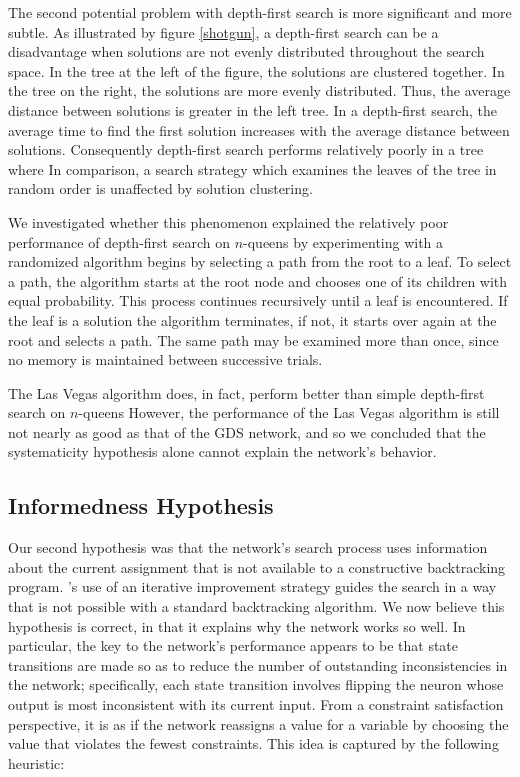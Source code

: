 \documentclass[twoside,12pt,titlepage,a4paper]{article}
\begin{document}
The second potential problem with depth-first search is more significant
and more subtle. As illustrated by figure \ref{shotgun}, a depth-first
search can be a
disadvantage when solutions are not evenly distributed throughout the
search space.  In the tree at the left of the figure, the solutions 
are clustered together. In the tree on the right,
the solutions are more evenly distributed. Thus, the average distance
between solutions is greater in the left tree.  In a depth-first
search, the average time to find the first solution 
increases with the average distance between solutions. Consequently
depth-first search performs relatively poorly in a tree where
In comparison,
a search strategy which examines the leaves of the tree in random
order is unaffected by solution clustering.

We investigated whether this phenomenon explained the relatively poor
performance 
of depth-first search on $n$-queens by experimenting with a randomized
algorithm begins by selecting a path from the root to a leaf. To
select a path, the algorithm starts at the root node and chooses one
of its children with equal probability. This process continues
recursively until a leaf is encountered.  If the leaf is a solution
the algorithm terminates, if not, it starts over again at the root and
selects a path. The same path may be examined more than once, since
no memory is maintained between successive trials.

The Las Vegas algorithm does, in fact, perform better than simple
depth-first search on $n$-queens %
However, the performance of the Las
Vegas algorithm is still not nearly as good as that of the GDS
network, and so we concluded that the systematicity hypothesis alone
cannot explain the network's behavior.

\subsection{Informedness Hypothesis}

Our second hypothesis was that the network's search process uses
information about the current assignment
that is not available to a constructive backtracking program.
's use of an iterative
improvement strategy guides the search in a way that is not possible
with a standard backtracking algorithm. 
We now believe this hypothesis
is correct, in that it explains why the network works so well.  In
particular, the key to the network's performance appears to be that
state transitions are made so as to reduce the number of outstanding
inconsistencies in the network; specifically, each state transition involves
flipping the neuron whose output is most
inconsistent with its current input. From a constraint satisfaction
perspective, it is as if the network reassigns a value for a variable
by choosing the value that violates the fewest constraints.
This idea is captured by the following heuristic:
\end{document}
